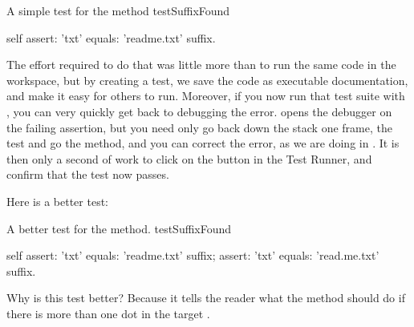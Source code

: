 \documentclass[a4paper,10pt,twoside]{book}
\begin{document}
\begin{method}[testSuffix]{A simple test for the  method}
testSuffixFound

	self assert: 'txt' equals: 'readme.txt' suffix.
\end{method}

The effort required to do that was little more than to run the same code in the workspace, but by creating a test, we save the code as executable documentation, and make it easy for others to run.
Moreover, if you now run that test suite with \sunit, you can very quickly get back to debugging the error.
\sunit opens the debugger on the failing assertion, but you need only go back down the stack one frame,  the test and go  the  method, and you can correct the error, as we are doing in .
It is then only a second of work to click on the  button in the \sunit Test Runner, and confirm that the test now passes.

Here is a better test:

\begin{method}[testSuffix2]{A better test for the  method.}
testSuffixFound

	self
		assert: 'txt' equals: 'readme.txt' suffix;
		assert: 'txt' equals: 'read.me.txt' suffix.
\end{method}
\noindent
Why is this test better?
Because it tells the reader what the method should do if there is more than one dot in the target .
\end{document}
